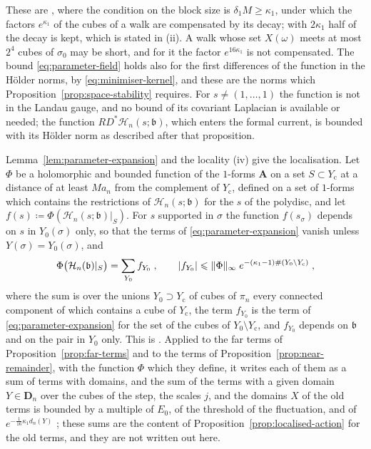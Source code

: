 \documentclass[11pt]{preprint}
\DeclarePairedDelimiter{\abs}{\lvert}{\rvert}
\DeclarePairedDelimiter{\norm}{\lVert}{\rVert}
\numberwithin{equation}{section}
\begin{document}
These are \cite[(1.7), (1.11)--(1.18), pp.~3--6]{BalabanRG2}, where the condition on the block size is $\delta_1M \geqslant \kappa_1$, under which the factors $e^{\kappa_1}$ of the cubes of a walk are compensated by its decay; with $2\kappa_1$ half of the decay is kept, which is stated in (ii). A walk whose set $X(\omega)$ meets at most $2^4$ cubes of $\sigma_0$ may be short, and for it the factor $e^{16\kappa_1}$ is not compensated. The bound \eqref{eq:parameter-field} holds also for the first differences of the function in the H\"older norms, by \eqref{eq:minimiser-kernel}, and these are the norms which Proposition~\ref{prop:space-stability} requires. For $s \neq (1, \dots, 1)$ the function is not in the Landau gauge, and no bound of its covariant Laplacian is available or needed; the function $RD^*\mathcal H_n(s; \mathfrak b)$, which enters the formal current, is bounded with its H\"older norm as described after that proposition.

Lemma~\ref{lem:parameter-expansion} and the locality (iv) give the localisation. Let $\Phi$ be a holomorphic and bounded function of the $1$-forms $\mathbf A$ on a set $S \subset Y_{\mathrm c}$ at a distance of at least $Ma_n$ from the complement of $Y_{\mathrm c}$, defined on a set of $1$-forms which contains the restrictions of $\mathcal H_n(s; \mathfrak b)$ for the $s$ of the polydisc, and let $f(s) \coloneqq \Phi(\mathcal H_n(s; \mathfrak b)|_S)$. For $s$ supported in $\sigma$ the function $f(s_\sigma)$ depends on $s$ in $Y_0(\sigma)$ only, so that the terms of \eqref{eq:parameter-expansion} vanish unless $Y(\sigma) = Y_0(\sigma)$, and
\begin{equation}\label{eq:parameter-localisation}
    \Phi\bigl(\mathcal H_n(\mathfrak b)|_S\bigr) = \sum_{Y_0}f_{Y_0}\;,
    \qquad
    \abs{f_{Y_0}} \leqslant \norm\Phi_\infty\;e^{-(\kappa_1 - 1)\#(Y_0 \setminus Y_{\mathrm c})}\;,
\end{equation}
where the sum is over the unions $Y_0 \supset Y_{\mathrm c}$ of cubes of $\pi_n$ every connected component of which contains a cube of $Y_{\mathrm c}$, the term $f_{Y_0}$ is the term of \eqref{eq:parameter-expansion} for the set of the cubes of $Y_0 \setminus Y_{\mathrm c}$, and $f_{Y_0}$ depends on $\mathfrak b$ and on the pair in $Y_0$ only. This is \cite[(1.10), (1.23)--(1.25)]{BalabanRG2}. Applied to the far terms of Proposition~\ref{prop:far-terms} and to the terms of Proposition~\ref{prop:near-remainder}, with the function $\Phi$ which they define, it writes each of them as a sum of terms with domains, and the sum of the terms with a given domain $Y \in \mathbf D_n$ over the cubes of the step, the scales $j$, and the domains $X$ of the old terms is bounded by a multiple of $E_0$, of the threshold of the fluctuation, and of $e^{-\frac{1}{16}\kappa_1d_n(Y)}$ \cite[(1.26)--(1.29), p.~8]{BalabanRG2}; these sums are the content of Proposition~\ref{prop:localised-action} for the old terms, and they are not written out here.
\end{document}

